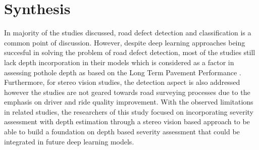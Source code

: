 \newpage
\section{Synthesis}
In majority of the studies discussed, road defect detection and classification is a common point of discussion. However, despite deep learning approaches being succesful in solving the problem of road defect detection, most of the studies still lack depth incorporation in their models which is considered as a factor in assessing pothole depth as based on the Long Term Pavement Performance \cite{miller2014}. Furthermore, for stereo vision studies, the detection aspect is also addressed however the studies are not geared towards road surveying processes due to the emphasis on driver and ride quality improvement. With the observed limitations in related studies, the researchers of this study focused on incorporating severity assessment with depth estimation through a stereo vision based approach to be able to build a foundation on depth based severity assessment that could be integrated in future deep learning models.

\newpage
